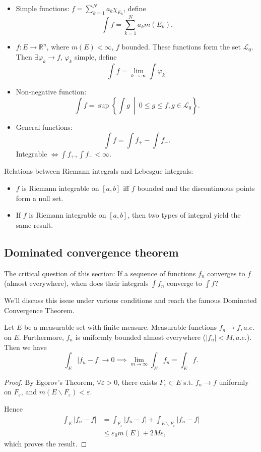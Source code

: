 \begin{itemize}
	\item Simple functions:
		$f=\sum_{k=1}^N a_k\chi_{E_k}$, define
		\[
			\int f = \sum_{k=1}^N a_km(E_k)
		.\]
	\item $f: E\to \mathbb{R}^n$, where $m(E)<\infty$, $f$ bounded.
		These functions form the set $\mathcal{L}_0$.
		Then $\exists \varphi_k \to f$,  $\varphi_k$ simple, define
		 \[
		\int f = \lim_{k\to \infty}\int \varphi_k
        .\]
	\item Non-negative function:
		\[
			\int f = \sup \left\{\int g\ \middle|\ 0\le g\le f, g\in \mathcal{L}_0\right\}
		.\]
	\item General functions:
		\[
		\int f = \int f_+ - \int f_-
		.\]
		Integrable $\iff \int f_+, \int f_- <\infty$.
\end{itemize}

Relations between Riemann integrals and Lebesgue integrals:
\begin{itemize}
	\item $f$ is Riemann integrable on $[a,b]$ iff
		$f$ bounded and the discontinuous points form a null set.
	\item If $f$ is Riemann integrable on $[a,b]$, then
		two types of integral yield the same result.
\end{itemize}

\subsection{Dominated convergence theorem}
\label{sub:Dominated convergence theorem}
The critical question of this section:
If a sequence of functions $f_n$ converges to $f$ (almost everywhere),
when does their integrals $\int f_n$ converge to  $\int f$?

We'll discuss this issue under various conditions and reach the
famous Dominated Convergence Theorem.

\begin{theorem}
	\label{thm:bounded convergence}
    Let $E$ be a measurable set with finite measure.
    Measurable functions $f_n\to f, a.e.$ on $E$.
	Furthermore, $f_n$ is uniformly bounded almost everywhere ($|f_n|<M,a.e.$).
	Then we have
	\[
	\int_E |f_n-f|\to 0 \implies \lim_{m\to \infty}\int_E f_n = \int_E f
	.\]
\end{theorem}
\begin{proof}[Proof]
    By Egorov's Theorem, $\forall \varepsilon>0$,
    there exists $F_\varepsilon \subset E$ s.t.
    $f_n\to f$ uniformly on $F_\varepsilon$,
    and $m(E\backslash F_\varepsilon)<\varepsilon$.
    
    Hence
    \begin{align*}
    \int_E|f_n-f| &= \int_{F_\varepsilon} |f_n-f| +
    \int_{E\backslash F_\varepsilon} |f_n-f|\\
    &\le \varepsilon_0 m(E) + 2M \varepsilon,
    \end{align*}
	which proves the result.
\end{proof}

